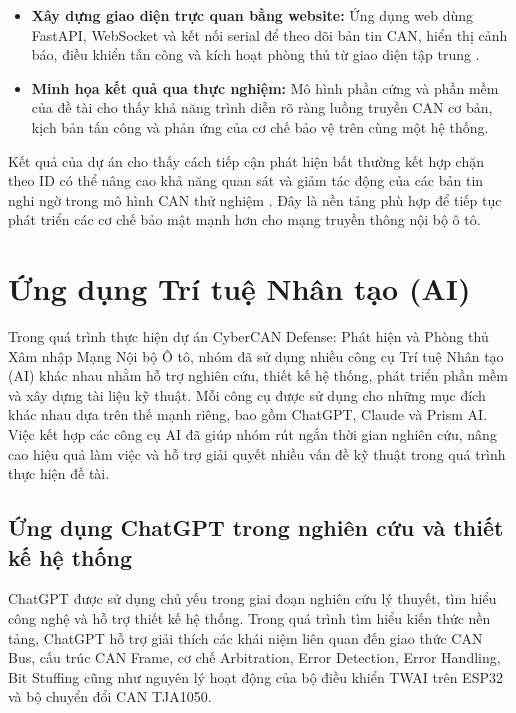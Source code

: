 \begin{itemize}[leftmargin=*]
\begin{itemize}
        \item Cơ chế phòng thủ cho phép phát hiện bản tin bất thường và cô lập tạm thời các CAN ID bị nghi ngờ ở mức ứng dụng \cite{koscher2010,miller2015}.
    \end{itemize}
    \item \textbf{Xây dựng giao diện trực quan bằng website:} Ứng dụng web dùng FastAPI, WebSocket và kết nối serial để theo dõi bản tin CAN, hiển thị cảnh báo, điều khiển tấn công và kích hoạt phòng thủ từ giao diện tập trung \cite{fastapi-docs,pyserial-docs}.
    \item \textbf{Minh họa kết quả qua thực nghiệm:} Mô hình phần cứng và phần mềm của đề tài cho thấy khả năng trình diễn rõ ràng luồng truyền CAN cơ bản, kịch bản tấn công và phản ứng của cơ chế bảo vệ trên cùng một hệ thống.
\end{itemize}

Kết quả của dự án cho thấy cách tiếp cận phát hiện bất thường kết hợp chặn theo ID có thể nâng cao khả năng quan sát và giảm tác động của các bản tin nghi ngờ trong mô hình CAN thử nghiệm \cite{koscher2010,miller2015}. Đây là nền tảng phù hợp để tiếp tục phát triển các cơ chế bảo mật mạnh hơn cho mạng truyền thông nội bộ ô tô.

\section{Ứng dụng Trí tuệ Nhân tạo (AI)}

Trong quá trình thực hiện dự án CyberCAN Defense: Phát hiện và Phòng thủ Xâm nhập Mạng Nội bộ Ô tô, nhóm đã sử dụng nhiều công cụ Trí tuệ Nhân tạo (AI) khác nhau nhằm hỗ trợ nghiên cứu, thiết kế hệ thống, phát triển phần mềm và xây dựng tài liệu kỹ thuật. Mỗi công cụ được sử dụng cho những mục đích khác nhau dựa trên thế mạnh riêng, bao gồm ChatGPT, Claude và Prism AI. Việc kết hợp các công cụ AI đã giúp nhóm rút ngắn thời gian nghiên cứu, nâng cao hiệu quả làm việc và hỗ trợ giải quyết nhiều vấn đề kỹ thuật trong quá trình thực hiện đề tài.

\subsection{Ứng dụng ChatGPT trong nghiên cứu và thiết kế hệ thống}

ChatGPT được sử dụng chủ yếu trong giai đoạn nghiên cứu lý thuyết, tìm hiểu công nghệ và hỗ trợ thiết kế hệ thống. Trong quá trình tìm hiểu kiến thức nền tảng, ChatGPT hỗ trợ giải thích các khái niệm liên quan đến giao thức CAN Bus, cấu trúc CAN Frame, cơ chế Arbitration, Error Detection, Error Handling, Bit Stuffing cũng như nguyên lý hoạt động của bộ điều khiển TWAI trên ESP32 và bộ chuyển đổi CAN TJA1050.

